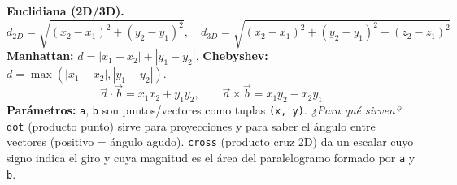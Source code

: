\textbf{Euclidiana (2D/3D).}
\[
d_{2D} = \sqrt{(x_2-x_1)^2+(y_2-y_1)^2}, \quad
d_{3D} = \sqrt{(x_2-x_1)^2+(y_2-y_1)^2+(z_2-z_1)^2}
\]
\textbf{Manhattan:}\;
\(d = |x_1-x_2| + |y_1-y_2|\), \quad
\textbf{Chebyshev:}\;
\(d = \max(|x_1-x_2|, |y_1-y_2|)\).
\[
\vec{a}\cdot\vec{b}=x_1x_2+y_1y_2,\qquad
\vec{a}\times\vec{b}=x_1y_2-x_2y_1
\]
\textbf{Parámetros:} \texttt{a}, \texttt{b} son puntos/vectores como tuplas \texttt{(x, y)}. \textit{¿Para qué sirven?} \texttt{dot} (producto punto) sirve para proyecciones y para saber el ángulo entre vectores (positivo = ángulo agudo). \texttt{cross} (producto cruz 2D) da un escalar cuyo signo indica el giro y cuya magnitud es el área del paralelogramo formado por \texttt{a} y \texttt{b}.
